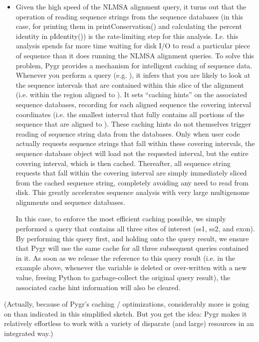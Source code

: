 \documentclass{howto}
\begin{document}
\begin{itemize}
\item
Given the high speed of the NLMSA alignment query, it turns out that the
operation of reading sequence strings from the sequence databases (in this
case, for printing them in printConservation() and calculating the percent identity
in pIdentity()) is the rate-limiting step for this analysis.  I.e. this analysis
spends far more time waiting for disk I/O to read a particular piece of sequence 
than it does running the NLMSA alignment queries.  To solve this problem, Pygr
provides a mechanism for intelligent caching of sequence data.  Whenever you
perform a query (e.g. ), it infers that you are likely to look
at the sequence intervals that are contained within this slice of the alignment
(i.e. within the region aligned to ).  It sets ``caching hints'' on the
associated sequence databases, recording for each aligned sequence
the covering interval coordinates (i.e. the smallest interval that fully contains
all portions of the sequence that are aligned to ).  These caching hints
do not themselves trigger reading of sequence string data from the databases.  Only
when user code actually requests sequence strings that fall within these covering
intervals, the sequence database object will load not the requested interval, but
the entire covering interval, which is then cached.  Thereafter, all sequence
string requests that fall within the covering interval are simply immediately sliced
from the cached sequence string, completely avoiding any need to read from disk.
This greatly accelerates sequence analysis with very large multigenome alignments
and sequence databases.  

In this case, to enforce the most efficient caching possible, we simply performed
a query that contains all three sites of interest (ss1, ss2, and exon).  By performing
this query first, and holding onto the query result, we ensure that Pygr will
use the same cache for all three subsequent queries contained in it.  As soon
as we release the reference to this query result (i.e. in the example above,
whenever the variable  is deleted or over-written with a new value,
freeing Python to garbage-collect the original query result), the associated 
cache hint information will also be cleared.

\end{itemize}

(Actually, because of Pygr's caching / optimizations, considerably more is going on than indicated in this simplified sketch.  But you get the idea: Pygr makes it relatively effortless to work with a variety of disparate (and large) resources in an integrated way.)
\end{document}
